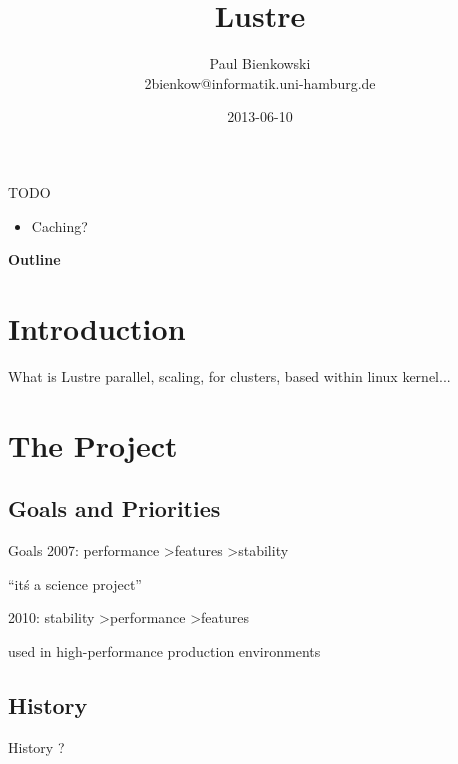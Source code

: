 \documentclass[compress,t]{beamer}
\title{Lustre}
\author{Paul Bienkowski \\[0.2em] \scriptsize 2bienkow@informatik.uni-hamburg.de}
\institute{Proseminar ``Ein-/Ausgabe - Stand der Wissenschaft''}
\date{2013-06-10}
\newif\iffinal
\newcommand{\sectiontoc}{
    \begin{frame}{\textbf{\insertsectionhead}}
        \tableofcontents[current]
    \end{frame}

    \addtocounter{framenumber}{-1}%
}
\begin{document}

\iffinal\else
\begin{frame}{TODO}
    \begin{itemize}
        \item Caching?
    \end{itemize}
\end{frame}
\fi

\begin{frame}
    \titlepage
\end{frame}

\begin{frame}{\textbf{Outline}}
    \tableofcontents
\end{frame}


\section{Introduction}

\begin{frame}{What is Lustre}
    parallel, scaling, for clusters, based within linux kernel...
\end{frame}


\section{The Project}
\sectiontoc

\subsection{Goals and Priorities}
\begin{frame}{Goals}
    2007: performance \textgreater features \textgreater stability

    ``it\'s a science project''

    2010: stability \textgreater performance \textgreater features

    used in high-performance production environments
\end{frame}

\subsection{History}
\begin{frame}{History}
    ?
\end{frame}
\end{document}
